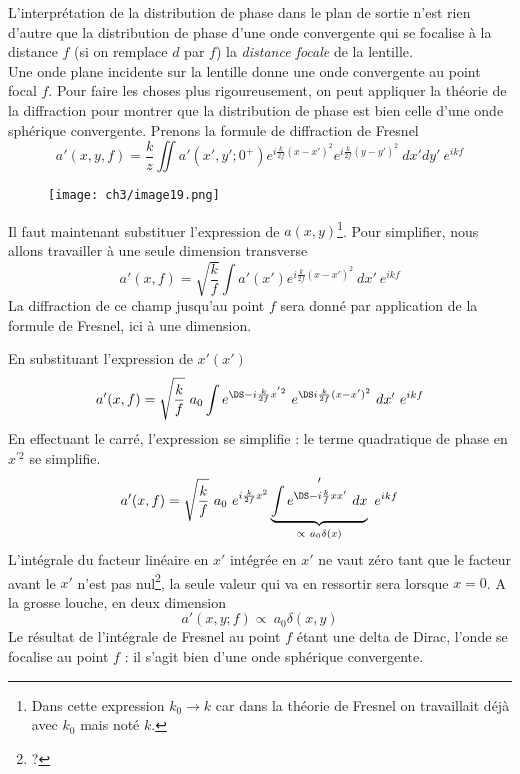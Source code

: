 L'interprétation de la distribution de phase dans le plan de sortie n'est rien d'autre que la distribution 
de phase d'une onde convergente qui se focalise à la distance $f$ (si on remplace $d$ par $f$) 
la \textit{distance focale} de la lentille.\\

Une onde plane incidente sur la lentille donne une onde convergente au point focal $f$. Pour faire les 
choses plus rigoureusement, on peut appliquer la théorie de la diffraction pour montrer que la distribution 
de phase est bien celle d'une onde sphérique convergente. Prenons la formule de diffraction de Fresnel
\begin{equation}
a'(x,y,f) = \dfrac{k}{z}\iint a'(x',y';0^+) e^{i\frac{k}{2f}(x-x')^2}e^{i\frac{k}{2f}(y-y')^2}\ dx'dy'\ e^{ikf}
\end{equation}

	\begin{wrapfigure}[8]{l}{5.5cm}
	\vspace{-5mm}
	\texttt{[image: ch3/image19.png]}
	\end{wrapfigure}
Il faut maintenant substituer l'expression de $a(x,y)$\footnote{Dans cette expression $k_0\rightarrow k$ car 
dans la théorie de Fresnel on travaillait déjà avec $k_0$ mais noté $k$.}. Pour simplifier, nous allons 
travailler à une seule dimension transverse
\begin{equation}
a'(x,f) = \sqrt{\dfrac{k}{f}}\int a'(x')e^{i\frac{k}{2f}(x-x')^2}\ dx'\ e^{ikf}
\end{equation}
La diffraction de ce champ jusqu'au point $f$ sera donné par application de la formule de Fresnel, ici à 
une dimension. 


\newpage
En substituant l'expression de $x'(x')$ 
\begin{equation}
a'(x,f) = \sqrt{\dfrac{k}{f}}\ a_0\int e^{\DS-i\frac{k}{2f}x^{'2}}\ e^{\DS i\frac{k}{2f}(x-x')^2}\ dx'\ e^{ikf}
\end{equation}
En effectuant le carré, l'expression se simplifie : le terme quadratique de phase en $x^{'2}$ se simplifie.
\begin{equation}
a'(x,f) = \sqrt{\dfrac{k}{f}}\ a_0\ e^{i\frac{k}{2f}x^2}\underbrace{\int  e^{\DS -i\frac{k}{f}xx'}\ dx}_{
\propto\ a_0\delta(x)}'\ e^{ikf}
\end{equation}
L'intégrale du facteur linéaire en $x'$ intégrée en $x'$ ne vaut zéro tant que le facteur avant le $x'$ 
n'est pas nul\footnote{?}, la seule valeur qui va en ressortir sera lorsque $x=0$. A la grosse louche, 
en deux dimension
\begin{equation}
a'(x,y;f) \propto\ a_0\delta(x,y)
\end{equation}
Le résultat de l'intégrale de Fresnel au point $f$ étant une delta de Dirac, l'onde se focalise au point 
$f$ : il s'agit bien d'une onde sphérique convergente.\\

